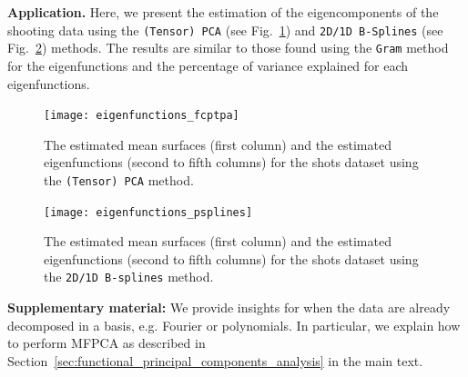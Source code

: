 \documentclass[times,sort&compress,3p]{elsarticle}
\theoremstyle{plain}%
\theoremstyle{definition}
\newenvironment{results}[1][]{\noindent \textbf{#1} \rmfamily}{\medskip}
\begin{document}

\begin{results}[Application.] Here, we present the estimation of the eigencomponents of the shooting data using the \texttt{(Tensor) PCA} (see Fig.~\ref{fig:eigenfunctions_fcptpa}) and \texttt{2D/1D B-Splines} (see Fig.~\ref{fig:eigenfunctions_psplines}) methods. The results are similar to those found using the \texttt{Gram} method for the eigenfunctions and the percentage of variance explained for each eigenfunctions.

\begin{figure}
    \centering
    \texttt{[image: eigenfunctions\_fcptpa]}
    \caption{The estimated mean surfaces (first column) and the estimated eigenfunctions (second to fifth columns) for the shots dataset using the \texttt{(Tensor) PCA} method.}
    \label{fig:eigenfunctions_fcptpa}
\end{figure}

\begin{figure}
    \centering
    \texttt{[image: eigenfunctions\_psplines]}
    \caption{The estimated mean surfaces (first column) and the estimated eigenfunctions (second to fifth columns) for the shots dataset using the \texttt{2D/1D B-splines} method.}
    \label{fig:eigenfunctions_psplines}
\end{figure}
\end{results}




%




\medskip

{\bf Supplementary material:} We provide insights for when the data are already decomposed in a basis, e.g. Fourier or polynomials. In particular, we explain how to perform MFPCA as described in Section~\ref{sec:functional_principal_components_analysis} in the main text.
\end{document}
